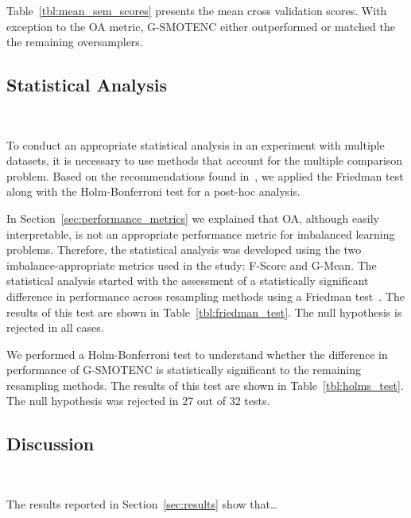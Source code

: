 \documentclass[parskip=full]{scrartcl}
\begin{document}


Table~\ref{tbl:mean_sem_scores} presents the mean cross validation scores.
With exception to the OA metric, G-SMOTENC either outperformed or matched the
the remaining oversamplers.



\subsection{Statistical Analysis}~\label{sec:statistical_analysis}

To conduct an appropriate statistical analysis in an experiment with multiple
datasets, it is necessary to use methods that account for the multiple
comparison problem. Based on the recommendations found in~\cite{Demsar2006},
we applied the Friedman test along with the Holm-Bonferroni test for a
post-hoc analysis.

In Section~\ref{sec:performance_metrics} we
explained that OA, although easily interpretable, is not an appropriate
performance metric for imbalanced learning problems. Therefore, the
statistical analysis was developed using the two imbalance-appropriate metrics
used in the study: F-Score and G-Mean. The statistical analysis started with
the assessment of a statistically significant difference in performance across
resampling methods using a Friedman test~\cite{friedman1937use}. The results
of this test are shown in Table~\ref{tbl:friedman_test}. The null hypothesis
is rejected in all cases.



We performed a Holm-Bonferroni test to understand whether the difference in
performance of G-SMOTENC is statistically significant to the remaining
resampling methods. The results of this test are shown in
Table~\ref{tbl:holms_test}. The null hypothesis was rejected in 27 out of 32 tests.



\subsection{Discussion}~\label{sec:discussion}

The results reported in Section~\ref{sec:results} show that\ldots
\end{document}
